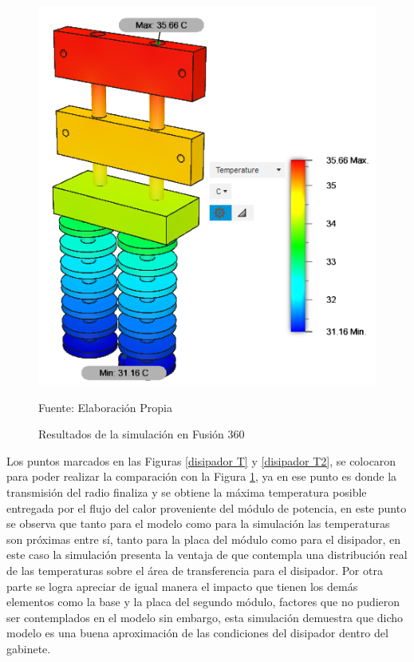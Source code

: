 \begin{figure}[H]
\centering
\includegraphics[scale=0.71]{Figuras/simulacion_1.png}
\caption{Resultados de la simulación en Fusión 360}
Fuente: Elaboración Propia
\label{simulacion1}
\end{figure}

Los puntos marcados en las Figuras \ref{disipador T} y \ref{disipador T2}, se colocaron para poder realizar la comparación con la Figura \ref{simulacion1}, ya en ese punto es donde la transmisión del radio finaliza y se obtiene la máxima temperatura posible entregada por el flujo del calor proveniente del módulo de potencia, en este punto se observa que tanto para el modelo como para la simulación las temperaturas son próximas entre sí, tanto para la placa del módulo como para el disipador, en este caso la simulación presenta la ventaja de que contempla una distribución real de las temperaturas sobre el área de transferencia para el disipador. Por otra parte se logra apreciar de igual manera el impacto que tienen los demás elementos como la base y la placa del segundo módulo, factores que no pudieron ser contemplados en el modelo sin embargo, esta simulación demuestra que dicho modelo es una buena aproximación de las condiciones del disipador dentro del gabinete.

